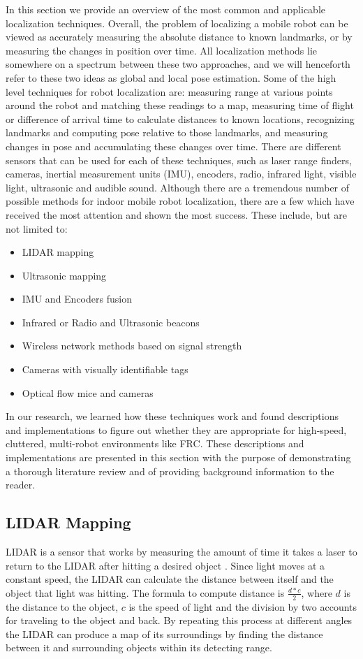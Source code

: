 \documentclass{article}
\begin{document}
   In this section we provide an overview of the most common and applicable localization techniques. Overall, the problem of localizing a mobile robot can be viewed as accurately measuring the absolute distance to known landmarks, or by measuring the changes in position over time. All localization methods lie somewhere on a spectrum between these two approaches, and we will henceforth refer to these two ideas as global and local pose estimation. Some of the high level techniques for robot localization are: measuring range at various points around the robot and matching these readings to a map, measuring time of flight or difference of arrival time to calculate distances to known locations, recognizing landmarks and computing pose relative to those landmarks, and measuring changes in pose and accumulating these changes over time. There are different sensors that can be used for each of these techniques, such as laser range finders, cameras, inertial measurement units (IMU), encoders, radio, infrared light, visible light, ultrasonic and audible sound. Although there are a tremendous number of possible methods for indoor mobile robot localization, there are a few which have received the most attention and shown the most success. These include, but are not limited to:
  \begin{itemize}
    \item LIDAR mapping
    \item Ultrasonic mapping
    \item IMU and Encoders fusion
    \item Infrared or Radio and Ultrasonic beacons
    \item Wireless network methods based on signal strength
    \item Cameras with visually identifiable tags
    \item Optical flow mice and cameras
  \end{itemize}

  In our research, we learned how these techniques work and found descriptions and implementations to figure out whether they are appropriate for high-speed, cluttered, multi-robot environments like FRC. These descriptions and implementations are presented in this section with the purpose of demonstrating a thorough literature review and of providing background information to the reader.

  \subsection{LIDAR Mapping}
    LIDAR is a sensor that works by measuring the amount of time it takes a laser to return to the LIDAR after hitting a desired object \cite{keith_lidar_2007}. Since light moves at a constant speed, the LIDAR can calculate the distance between itself and the object that light was hitting. The formula to compute distance is $\frac{d*c}{2}$, where $d$ is the distance to the object, $c$ is the speed of light and the division by two accounts for traveling to the object and back. By repeating this process at different angles the LIDAR can produce a map of its surroundings by finding the distance between it and surrounding objects within its detecting range.
\end{document}
